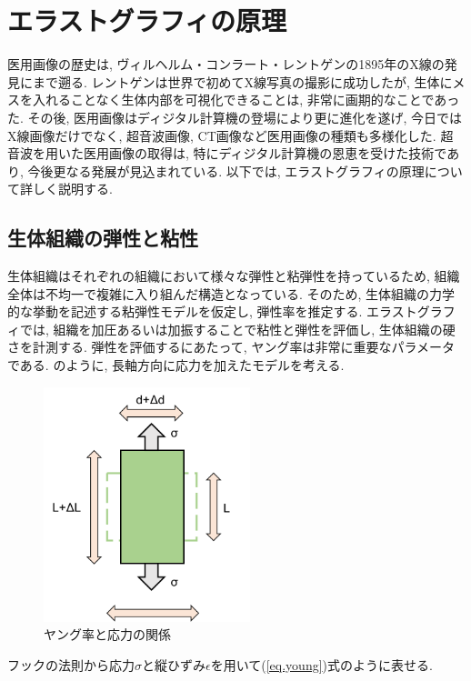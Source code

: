 \section{エラストグラフィの原理}
医用画像の歴史は, ヴィルヘルム・コンラート・レントゲンの1895年のX線の発見にまで遡る. レントゲンは世界で初めてX線写真の撮影に成功したが,  生体にメスを入れることなく生体内部を可視化できることは, 非常に画期的なことであった. その後, 医用画像はディジタル計算機の登場により更に進化を遂げ, 今日ではX線画像だけでなく, 超音波画像, CT画像など医用画像の種類も多様化した. 超音波を用いた医用画像の取得は, 特にディジタル計算機の恩恵を受けた技術であり, 今後更なる発展が見込まれている. 以下では, エラストグラフィの原理について詳しく説明する. %
\subsection{生体組織の弾性と粘性\cite{elastography2}}
生体組織はそれぞれの組織において様々な弾性と粘弾性を持っているため, 組織全体は不均一で複雑に入り組んだ構造となっている. そのため, 生体組織の力学的な挙動を記述する粘弾性モデルを仮定し, 弾性率を推定する.%
エラストグラフィでは, 組織を加圧あるいは加振することで粘性と弾性を評価し, 生体組織の硬さを計測する. 弾性を評価するにあたって, ヤング率は非常に重要なパラメータである. のように, 長軸方向に応力を加えたモデルを考える. 
\begin{figure}[H]
  \begin{center}
    \includegraphics[width=60mm]{fig/young.pdf}
  \end{center}
  \caption{ヤング率と応力の関係}
\end{figure}
フックの法則から応力$\sigma$と縦ひずみ$\epsilon$を用いて(\ref{eq.young})式のように表せる. 
